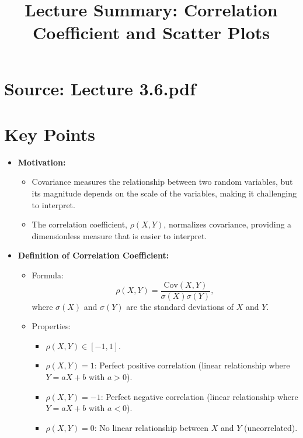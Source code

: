 \documentclass{article}
\title{Lecture Summary: Correlation Coefficient and Scatter Plots}
\author{}
\date{}
\begin{document}
\maketitle

\section*{Source: Lecture 3.6.pdf}

\section*{Key Points}

\begin{itemize}
  \item \textbf{Motivation:}
    \begin{itemize}
      \item Covariance measures the relationship between two random variables, but its magnitude depends on the scale of the variables, making it challenging to interpret.
      \item The correlation coefficient, $\rho(X, Y)$, normalizes covariance, providing a dimensionless measure that is easier to interpret.
    \end{itemize}

  \item \textbf{Definition of Correlation Coefficient:}
    \begin{itemize}
      \item Formula:
        \[
          \rho(X, Y) = \frac{\text{Cov}(X, Y)}{\sigma(X)\sigma(Y)},
        \]
        where $\sigma(X)$ and $\sigma(Y)$ are the standard deviations of $X$ and $Y$.
      \item Properties:
        \begin{itemize}
          \item $\rho(X, Y) \in [-1, 1]$.
          \item $\rho(X, Y) = 1$: Perfect positive correlation (linear relationship where $Y = aX + b$ with $a > 0$).
          \item $\rho(X, Y) = -1$: Perfect negative correlation (linear relationship where $Y = aX + b$ with $a < 0$).
          \item $\rho(X, Y) = 0$: No linear relationship between $X$ and $Y$ (uncorrelated).
        \end{itemize}
    \end{itemize}


\end{itemize}
\end{document}
